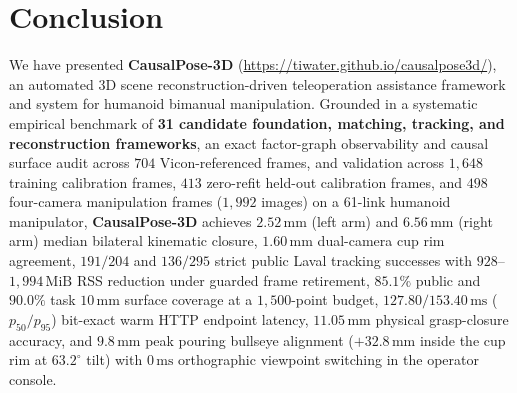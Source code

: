 \documentclass[10pt,journal]{IEEEtran}
\begin{document}
\section{Conclusion}
\label{sec:conclusion}
We have presented \textbf{CausalPose-3D} (\url{https://tiwater.github.io/causalpose3d/}), an automated 3D scene reconstruction-driven teleoperation assistance framework and system for humanoid bimanual manipulation. Grounded in a systematic empirical benchmark of \textbf{31 candidate foundation, matching, tracking, and reconstruction frameworks}, an exact factor-graph observability and causal surface audit across $704$ Vicon-referenced frames, and validation across $1{,}648$ training calibration frames, $413$ zero-refit held-out calibration frames, and $498$ four-camera manipulation frames ($1{,}992$ images) on a 61-link humanoid manipulator, \textbf{CausalPose-3D} achieves $2.52\,\mathrm{mm}$ (left arm) and $6.56\,\mathrm{mm}$ (right arm) median bilateral kinematic closure, $1.60\,\mathrm{mm}$ dual-camera cup rim agreement, $191/204$ and $136/295$ strict public Laval tracking successes with $928$--$1{,}994\,\mathrm{MiB}$ RSS reduction under guarded frame retirement, $85.1\%$ public and $90.0\%$ task $10\,\mathrm{mm}$ surface coverage at a $1{,}500$-point budget, $127.80 / 153.40\,\mathrm{ms}$ ($p_{50}/p_{95}$) bit-exact warm HTTP endpoint latency, $11.05\,\mathrm{mm}$ physical grasp-closure accuracy, and $9.8\,\mathrm{mm}$ peak pouring bullseye alignment ($+32.8\,\mathrm{mm}$ inside the cup rim at $63.2^\circ$ tilt) with $0\,\mathrm{ms}$ orthographic viewpoint switching in the operator console.
\end{document}
